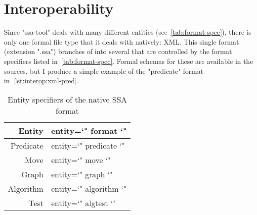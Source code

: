 \section{Interoperability}
\label{sec:iface-interoperability}
Since "ssa-tool" deals with many different entities (see~\autoref{tab:format-spec}),
  there is only one formal file type that it deals with natively: XML.
This single format (extension ".ssa") branches of into several 
  that are controlled by the format specifiers listed in~\autoref{tab:format-spec}.
Formal schemas for these are available in the sources,
  but I produce a simple example of the "predicate" format in~\autoref{lst:interop:xml-pred}.


\begin{table}
  \centering
  \begin{tabular}{r>{\ttfamily\small entity=\char`"}l<{\char`"}}
    \toprule
    Entity    & format    \\
    \midrule
    Predicate & predicate \\
    Move      & move      \\
    Graph     & graph     \\
    Algorithm & algorithm \\
    Test      & algtest   \\
    \bottomrule
  \end{tabular}
  \caption{Entity specifiers of the native SSA format}
  \label{tab:format-spec}
\end{table}

